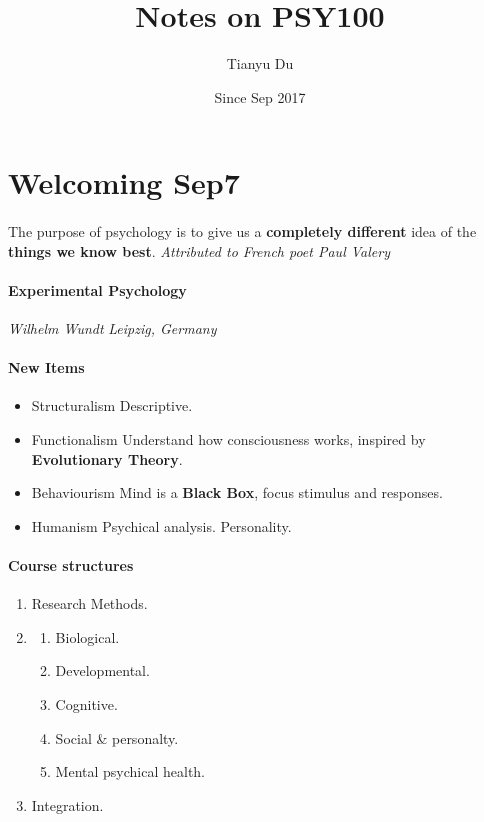 \documentclass{article}
\author{Tianyu Du}
\date{Since Sep 2017}
\title{Notes on PSY100}
\begin{document}
	\maketitle
	\tableofcontents
	\section{Welcoming Sep7}
	\paragraph{}The purpose of psychology is to give us a \textbf{completely different} idea of the \textbf{things we know best}. \emph{Attributed to French poet Paul Valery}
	\paragraph{Experimental Psychology} \emph{Wilhelm Wundt} \emph{Leipzig, Germany}
	\paragraph{New Items}
	\begin{itemize}
		\item Structuralism \newline Descriptive.
		\item Functionalism \newline Understand how consciousness works, inspired by \textbf{Evolutionary Theory}.
		\item Behaviourism \newline Mind is a \textbf{Black Box}, focus stimulus and responses.
		\item Humanism \newline Psychical analysis. Personality.
	\end{itemize}
	\paragraph{Course structures}
	\begin{enumerate}
		\item Research Methods.
		\item \begin{enumerate}
			\item Biological.
			\item Developmental.
			\item Cognitive.
			\item Social \& personalty.
			\item Mental psychical health.
		\end{enumerate}
		\item Integration.
	\end{enumerate}
\end{document}

